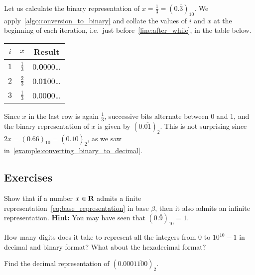 \begin{example}
    Let us calculate the binary representation of $x = \frac{1}{3} = (0.\overline{3})_{10}$.
    We apply~\cref{algo:conversion_to_binary} and collate the values of $i$ and $x$ at the beginning of each iteration,
    i.e.\ just before~\cref{line:after_while}, in the table below.
    \begin{center}
    \begin{tabular}{|c|c|c|}
        \hline
        $i$ & $x$ & Result \\ \hline
        $1$ & $\frac{1}{3}$ & 0.\textbf{0}000\dots \\ \hline
        $2$ & $\frac{2}{3}$ & 0.0\textbf{1}00\dots \\ \hline
        $3$ & $\frac{1}{3}$ & 0.00\textbf{0}0\dots \\ \hline
    \end{tabular}
    \end{center}
    Since $x$ in the last row is again $\frac{1}{3}$,
    successive bits alternate between 0 and 1,
    and the binary representation of $x$ is given by $(0.\overline{01})_2$.
    This is not surprising since $2x = (0.66)_{10} = (0.\overline{10})_2$,
    as we saw in~\cref{example:converting_binary_to_decimal}.
\end{example}

\subsection{Exercises}%

\begin{exercise}
    \label{exercise:non_unique_representation}
    Show that if a number $x \in \mathbf R$ admits a finite representation~\eqref{eq:base_representation} in base $\beta$,
    then it also admits an infinite representation.
    \textbf{Hint:} You may have seen that $(0.\overline 9)_{10} = 1$.
\end{exercise}

\begin{exercise}
    How many digits does it take to represent all the integers from 0 to $10^{10} - 1$ in decimal and binary format?
    What about the hexadecimal format?
\end{exercise}

\begin{exercise}
    Find the decimal representation of $(0.000\overline{1100})_2$.
\end{exercise}

